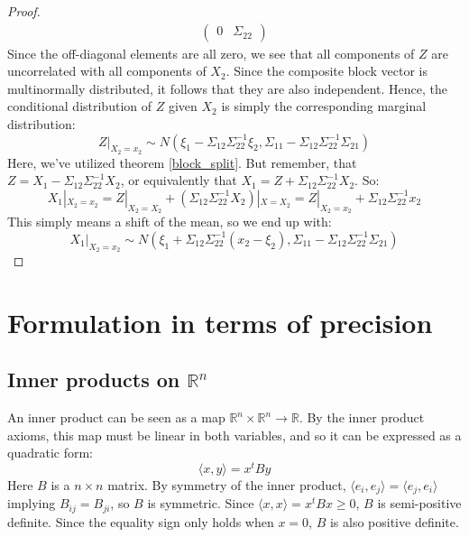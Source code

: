 \documentclass[12pt, a4paper]{article}
\numberwithin{equation}{section}
\begin{document}
\begin{proof}
\begin{align}
\begin{pmatrix}
0 & \Sigma_{22}
\end{pmatrix}
\end{align}
Since the off-diagonal elements are all zero, we see that all components of $Z$ are uncorrelated with all components of $X_2$. Since the composite block vector is multinormally distributed, it follows that they are also independent. Hence, the conditional distribution of $Z$ given $X_2$ is simply the corresponding marginal distribution:
\begin{equation}
Z|_{X_2=x_2}\sim N(\xi_1-\Sigma_{12}\Sigma_{22}^{-1}\xi_2,\Sigma_{11}-\Sigma_{12}\Sigma_{22}^{-1}\Sigma_{21})
\end{equation}
Here, we've utilized theorem \ref{block_split}. But remember, that $Z=X_1-\Sigma_{12}\Sigma_{22}^{-1}X_2$, or equivalently that $X_1=Z+\Sigma_{12}\Sigma_{22}^{-1}X_2$. So:
\begin{equation}
X_1|_{X_2=x_2}=Z|_{X_2=X_2}+(\Sigma_{12}\Sigma_{22}^{-1}X_2)|_{X=X_2}=Z|_{X_2=x_2}+\Sigma_{12}\Sigma_{22}^{-1}x_2
\end{equation}
This simply means a shift of the mean, so we end up with:
\begin{equation}
X_1|_{X_2=x_2}\sim N(\xi_1+\Sigma_{12}\Sigma_{22}^{-1}(x_2-\xi_2),\Sigma_{11}-\Sigma_{12}\Sigma_{22}^{-1}\Sigma_{21})
\end{equation}
\end{proof}

\section{Formulation in terms of precision}

\subsection{Inner products on $\mathbb{R}^n$}
An inner product can be seen as a map $\mathbb{R}^n\times\mathbb{R}^n\rightarrow\mathbb{R}$. By the inner product axioms, this map must be linear in both variables, and so it can be expressed as a quadratic form:
\begin{equation}
\langle x,y\rangle=x^t By
\end{equation}
Here $B$ is a $n\times n$ matrix. By symmetry of the inner product, $\langle e_i,e_j\rangle=\langle e_j,e_i\rangle$ implying $B_{ij}=B_{ji}$, so $B$ is symmetric. Since $\langle x,x\rangle=x^t Bx\ge 0$, $B$ is semi-positive definite. Since the equality sign only holds when $x=0$, $B$ is also positive definite.
\end{document}
